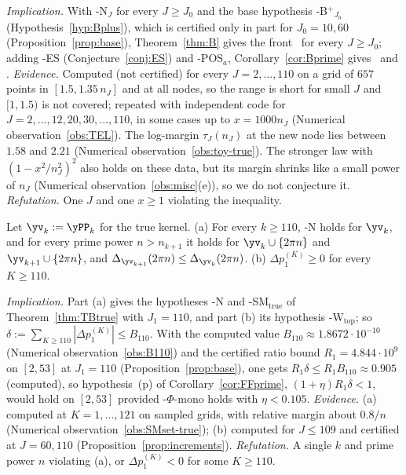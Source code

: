 \emph{Implication.} With \hyp{N}$_J$ for every $J\ge J_0$ and the base hypothesis \hyp{B$^+$}$_{J_0}$
(Hypothesis~\ref{hyp:Bplus}), which is certified only in part for $J_0=10,60$ (Proposition~\ref{prop:base}),
Theorem~\ref{thm:B} gives the front \FRt\ for every $J\ge J_0$; adding \hyp{ES} (Conjecture~\ref{conj:ES}) and \hyp{POS$_a$},
Corollary~\ref{cor:Bprime} gives \condS\ and \condU. \emph{Evidence.} Computed (not certified) for every $J=2,\dots,110$ on a
grid of $657$ points in $[1.5,1.35\,n_J]$ and at all nodes, so the range is short for small $J$ and $[1,1.5)$ is not
covered; repeated with independent code for $J=2,\dots,12,20,30,\dots,110$, in some cases up to $x=1000n_J$ (Numerical
observation~\ref{obs:TEL}). The log-margin $\tau_J(n_J)$ at the new node lies between $1.58$ and $2.21$ (Numerical
observation~\ref{obs:toy-true}). The stronger law with $(1-x^2/n_J^2)^2$ also holds on these data, but its margin shrinks like a
small power of $n_J$ (Numerical observation~\ref{obs:misc}(e)), so we do not conjecture it. \emph{Refutation.} One $J$ and one $x\ge1$ violating the
inequality.

\begin{conjecture}[The true insertion laws beyond $J=110$]\label{conj:SMtrue}
Let $\yv_k:=\yPP_k$ for the true kernel. \textup{(a)} For every $k\ge110$, \hyp{N} holds for $\yv_k$, and for every prime
power $n>n_{k+1}$ it holds for $\yv_k\cup\{2\pi n\}$ and $\yv_{k+1}\cup\{2\pi n\}$, and
$\Delta_{\yv_{k+1}}(2\pi n)\le\Delta_{\yv_k}(2\pi n)$.
\textup{(b)} $\Delta p_1^{(K)}\ge0$ for every $K\ge110$.
\end{conjecture}

\emph{Implication.} Part (a) gives the hypotheses \hyp{N} and \hyp{SM}$_{\mathrm{true}}$ of Theorem~\ref{thm:TBtrue} with
$J_1=110$, and part (b) its hypothesis \hyp{W}$_{\mathrm{top}}$; so $\delta:=\sum_{K\ge110}|\Delta p_1^{(K)}|\le B_{110}$. With the
computed value $B_{110}\approx1.8672\cdot10^{-10}$ (Numerical observation~\ref{obs:B110}) and the certified ratio bound
$R_1=4.844\cdot10^9$ on $[2,53]$ at $J_1=110$ (Proposition~\ref{prop:base}), one gets $R_1\delta\le R_1B_{110}\approx0.905$
(computed), so hypothesis~(p) of Corollary~\ref{cor:FFprime}, $(1+\eta)R_1\delta<1$, would hold on $[2,53]$ provided
\hyp{$\Phi$-mono} holds with $\eta<0.105$.
\emph{Evidence.} (a) computed at $K=1,\dots,121$ on sampled grids, with relative margin about $0.8/n$ (Numerical
observation~\ref{obs:SMset-true}); (b) computed for $J\le109$ and certified at $J=60,110$ (Proposition~\ref{prop:increments}). \emph{Refutation.} A single $k$ and prime power $n$ violating (a), or
$\Delta p_1^{(K)}<0$ for some $K\ge110$.

